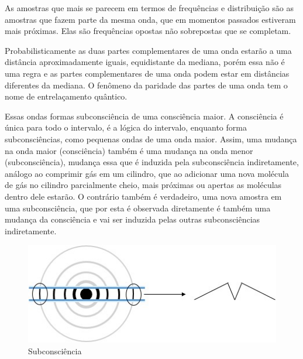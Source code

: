 As amostras que mais se parecem em termos de frequências e distribuição são as amostras que fazem parte da mesma onda, que em momentos passados estiveram mais próximas. Elas são frequências opostas não sobrepostas que se completam.

Probabilisticamente as duas partes complementares de uma onda estarão a uma distância aproximadamente iguais, equidistante da mediana, porém essa não é uma regra e as partes complementares de uma onda podem estar em distâncias diferentes da mediana. O fenômeno da paridade das partes de uma onda tem o nome de entrelaçamento quântico.

Essas ondas formas subconsciência de uma consciência maior. A consciência é única para todo o intervalo, é a lógica do intervalo, enquanto forma subconsciências, como pequenas ondas de uma onda maior. Assim, uma mudança na onda maior (consciência) também é uma mudança na onda menor (subconsciência), mudança essa que é induzida pela subconsciência indiretamente, análogo ao comprimir gás em um cilindro, que ao adicionar uma nova molécula de gás no cilindro parcialmente cheio, mais próximas ou apertas as moléculas dentro dele estarão. O contrário também é verdadeiro, uma nova amostra em uma subconsciência, que por esta é observada diretamente é também uma mudança da consciência e vai ser induzida pelas outras subconsciências indiretamente.
\begin{figure}[H]
\caption{Subconsciência}
\label{fig:consciousness_subconscious}
\centering
\includegraphics[scale=1]{sections/images/consciousness_subconscious.jpg}
\end{figure}

